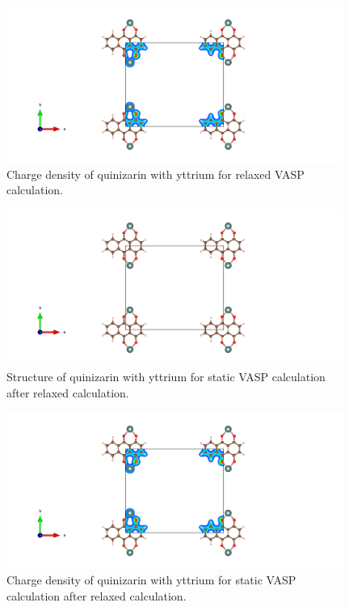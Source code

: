 \documentclass{article}
\begin{document}
  \begin{figure}[H]
      \centering
      \includegraphics[width = 11cm]{../fig/Y_relax_CHGCAR.png}
      \caption{Charge density of quinizarin with yttrium for relaxed VASP calculation. }
      \label{fig:Y_relax_CHGCAR}
  \end{figure}

  \begin{figure}[H]
      \centering
      \includegraphics[width = 11cm]{../fig/Y_staticafter_CONTCAR.png}
      \caption{Structure of quinizarin with yttrium for static VASP calculation after relaxed calculation. }
      \label{fig:Y_staticafter_CONTCAR}
  \end{figure}

  \begin{figure}[H]
      \centering
      \includegraphics[width = 11cm]{../fig/Y_staticafter_CHGCAR.png}
      \caption{Charge density of quinizarin with yttrium for static VASP calculation after relaxed calculation. }
      \label{fig:Y_staticafter_CHGCAR}
  \end{figure}
\end{document}
